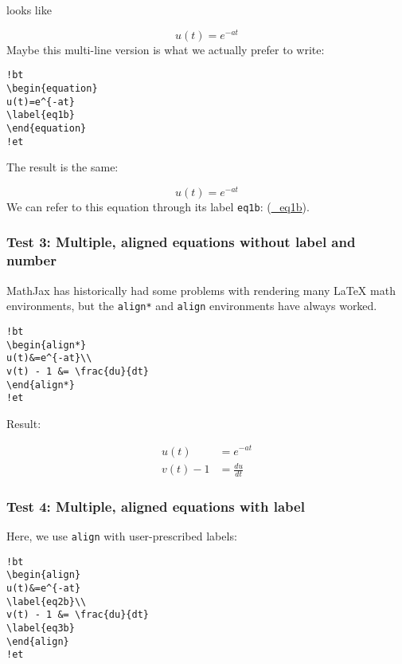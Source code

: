 \documentclass[]{article}
\begin{document}
looks like

\[
\begin{equation} u(t)=e^{-at} \label{_eq1a}\end{equation}
\] Maybe this multi-line version is what we actually prefer to write:

\begin{verbatim}
!bt
\begin{equation}
u(t)=e^{-at}
\label{eq1b}
\end{equation}
!et
\end{verbatim}

The result is the same:

\[
\begin{equation}
u(t)=e^{-at} \label{_eq1b}
\end{equation}
\] We can refer to this equation through its label \texttt{eq1b}:
(\protect\hyperlink{_eq1b}{\_eq1b}).

\subsubsection{Test 3: Multiple, aligned equations without label and
number}\label{test-3-multiple-aligned-equations-without-label-and-number}

MathJax has historically had some problems with rendering many LaTeX
math environments, but the \texttt{align*} and \texttt{align}
environments have always worked.

\begin{verbatim}
!bt
\begin{align*}
u(t)&=e^{-at}\\ 
v(t) - 1 &= \frac{du}{dt}
\end{align*}
!et
\end{verbatim}

Result:

\[
\begin{align*}
u(t)&=e^{-at}\\ 
v(t) - 1 &= \frac{du}{dt}
\end{align*}
\]

\subsubsection{Test 4: Multiple, aligned equations with
label}\label{test-4-multiple-aligned-equations-with-label}

Here, we use \texttt{align} with user-prescribed labels:

\begin{verbatim}
!bt
\begin{align}
u(t)&=e^{-at}
\label{eq2b}\\ 
v(t) - 1 &= \frac{du}{dt}
\label{eq3b}
\end{align}
!et
\end{verbatim}
\end{document}
